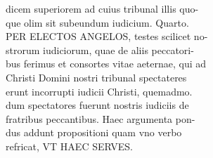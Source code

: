 \documentclass{article}
\begin{document}
\begin{pages}
                dicem superiorem ad cuius tribunal illis quo- \\
                que olim sit subeundum iudicium. Quarto. \\
                PER ELECTOS ANGELOS, testes scilicet no- \\
                strorum iudiciorum, quae de aliis peccatori- \\
                bus ferimus et consortes vitae aeternae, qui ad \\
                Christi Domini nostri tribunal spectateres \\
                erunt incorrupti iudicii Christi, quemadmo. \\
                dum spectatores fuerunt nostris iudiciis de \\
                fratribus peccantibus. Haec argumenta pon- \\
                dus addunt propositioni quam vno verbo \\
                refricat, VT HAEC SERVES. \\
                

\end{pages}
\end{document}
